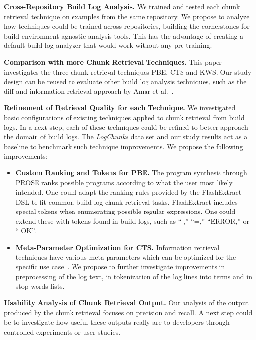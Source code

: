 \textbf{Cross-Repository Build Log Analysis.}
We trained and
tested each chunk retrieval technique on examples from the same
repository.
We propose to analyze how techniques could be trained
across repositories, building the cornerstones for build
environment-agnostic analysis tools. This has the advantage of creating
a default build log analyzer that would work without any pre-training.

\textbf{Comparison with more Chunk Retrieval Techniques.}
This
paper investigates the three chunk retrieval techniques PBE, CTS and
KWS\@.
Our study design can be reused to evaluate other build log
analysis techniques, such as the diff and information retrieval
approach by Amar et al.~\cite{amar2019mining}.

\textbf{Refinement of Retrieval Quality for each Technique.} We
investigated basic configurations of existing techniques applied to
chunk retrieval from build logs.
In a next step, each of these
techniques could be refined to better approach the domain of build
logs.
The \emph{LogChunks} data set and our study results act as a
baseline to benchmark such technique improvements.
We propose the
following improvements:
\begin{itemize}[leftmargin=0.4cm]
  \item \textbf{Custom Ranking and Tokens for PBE.} The program
  synthesis through PROSE ranks possible programs according to
  what the user most likely intended.
  One could adapt the ranking
  rules provided by the FlashExtract DSL to fit common build log
  chunk retrieval tasks.
  FlashExtract includes special tokens when
  enumerating possible regular expressions.
  One could extend these
  with tokens found in build logs, such as ``-,''
	``=,'' ``ERROR,''
  or ``[OK''.
  \item \textbf{Meta-Parameter Optimization for CTS.} Information
  retrieval techniques have various meta-parameters which can be
  optimized for the specific use
  case~\cite{panichella2016parameterizing}.
  We propose to further
  investigate improvements in preprocessing of the log text, in
  tokenization of the log lines into terms and in stop words
  lists.
\end{itemize}

\textbf{Usability Analysis of Chunk Retrieval Output.}
Our
analysis of the output produced by the chunk retrieval focuses on
precision and recall.
A next step could be to investigate how useful these
outputs really are to developers through controlled experiments or user studies.

